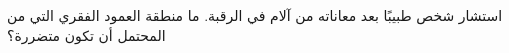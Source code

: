 
\begin{question}

\begin{instance}

\begin{mcq}[standalone=false]

\begin{stem}
استشار شخص طبيبًا بعد معاناته من آلام في الرقبة. ما منطقة العمود الفقري التي من المحتمل أن تكون متضررة؟\par

\end{stem}

\begin{distractors}
        
\end{distractors}

\end{mcq}

\end{instance}

\end{question}
